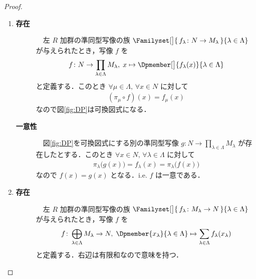 \documentclass[algtopo_main]{subfiles}
\begin{document}
\begin{proof}
	\begin{enumerate}
		\item 
		\begin{description}
			\item[\textbf{存在}]　左 $R$ 加群の準同型写像の族 $\Familyset[\big]{\, f_\lambda \colon N \to M_\lambda\,}{\lambda\in\Lambda}$ が与えられたとき，写像 $f$ を
			\begin{align}
				f \colon N \to \prod_{\lambda\in\Lambda}M_\lambda,\; x \mapsto \Dpmember[\big]{f_\lambda(x)}{\lambda\in\Lambda}
			\end{align}
			と定義する．このとき $\forall \mu \in \Lambda,\,\forall x \in N$ に対して
			\begin{align}
				(\pi_\mu \circ f)(x) = f_\mu(x)
			\end{align}
			なので図\ref{fig:DP}は可換図式になる．
			\item[\textbf{一意性}]　図\ref{fig:DP}を可換図式にする別の準同型写像 $g \colon N \to \displaystyle \prod_{\lambda\in\Lambda}M_\lambda$ が存在したとする．このとき $\forall x \in N,\,\forall \lambda \in \Lambda$ に対して
			\begin{align}
				\pi_\lambda \bigl( g(x) \bigr) = f_\lambda(x) = \pi_\lambda \bigl( f(x) \bigr) 
			\end{align}
			なので $f(x) = g(x)$ となる．i.e. $f$ は一意である．
		\end{description}
		\item 
		\begin{description}
			\item[\textbf{存在}]　左 $R$ 加群の準同型写像の族 $\Familyset[\big]{\, f_\lambda \colon M_\lambda \to N\,}{\lambda\in\Lambda}$ が与えられたとき，写像 $f$ を
			\begin{align}
				f \colon \bigoplus_{\lambda\in\Lambda} M_\lambda \to N,\; \Dpmember{x_\lambda}{\lambda\in\Lambda} \mapsto \sum_{\lambda \in \Lambda} f_\lambda(x_\lambda)
			\end{align}
			と定義する．右辺は有限和なので意味を持つ．


\end{description}
\end{enumerate}
\end{proof}
\end{document}
